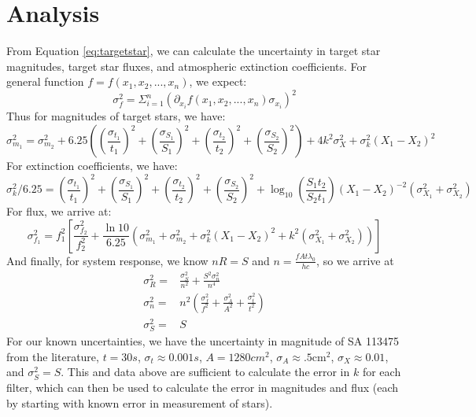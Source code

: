 \documentclass{article}
\begin{document}
\section{Analysis}
From Equation \ref{eq:targetstar}, we can calculate the uncertainty in target star magnitudes, target star fluxes, and atmospheric extinction coefficients.
For general function $f=f(x_1, x_2, ..., x_n)$, we expect: $$\sigma_f^2=\Sigma_{i=1}^{n}(\partial_{x_i}f(x_1, x_2, ..., x_n)\sigma_{x_i})^2$$
Thus for magnitudes of target stars, we have:
\begin{equation*}
\sigma_{m_1}^2=\sigma_{m_2}^2+6.25\left(\left(\frac{\sigma_{t_1}}{t_1}\right)^2+\left(\frac{\sigma_{S_1}}{S_1}\right)^2
+\left(\frac{\sigma_{t_2}}{t_2}\right)^2+\left(\frac{\sigma_{S_2}}{S_2}\right)^2\right) + 4k^2\sigma_X^2+\sigma_k^2(X_1-X_2)^2
\end{equation*}
For extinction coefficients, we have:
\begin{equation*}
\sigma_k^2/6.25=\left(\frac{\sigma_{t_1}}{t_1}\right)^2+\left(\frac{\sigma_{S_1}}{S_1}\right)^2
+\left(\frac{\sigma_{t_2}}{t_2}\right)^2+\left(\frac{\sigma_{S_2}}{S_2}\right)^2
+\log_{10}\left(\frac{S_1t_2}{S_2t_1}\right)(X_1-X_2)^{-2}(\sigma_{X_1}^2+\sigma_{X_2}^2)
\end{equation*}
For flux, we arrive at:
\begin{equation*}
\sigma_{f_1}^2=f_1^2\left[
\frac{\sigma_{f_2}^2}{f_2^2}+\frac{\ln10}{6.25}\left(
\sigma_{m_1}^2+\sigma_{m_2}^2+\sigma_k^2(X_1-X_2)^2+k^2(\sigma_{X_1}^2+\sigma_{X_2}^2)
\right)
\right]
\end{equation*}
And finally, for system response, we know $nR=S$ and $n=\frac{fAt\lambda_0}{hc}$, so we arrive at
\begin{align*}
\sigma_R^2=&\frac{\sigma_S^2}{n^2}+\frac{S^2\sigma_n^2}{n^4} \\
\sigma_n^2=&n^2\left(\frac{\sigma_f^2}{f^2}+\frac{\sigma_A^2}{A^2}+\frac{\sigma_t^2}{t^2}\right)\\
\sigma_S^2=&S
\end{align*}
For our known uncertainties, we have the uncertainty in magnitude of SA 113475 from the literature, $t=30s$,
$\sigma_t\approx0.001s$,
$A=1280cm^2$,
$\sigma_A\approx.5\textrm{cm}^2$,
$\sigma_X\approx0.01$, and $\sigma_S^2=S$. This and data above are sufficient to calculate the error in $k$ for each filter,
which can then be used to calculate the error in magnitudes and flux (each by starting with known error in measurement of stars).
\end{document}
